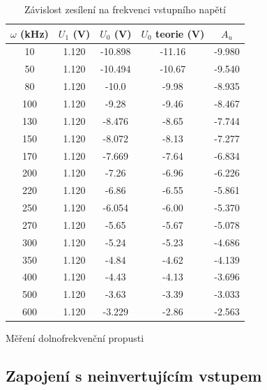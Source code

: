 \documentclass[a4paper,11pt]{article}
\begin{document}
\begin{table}[h]
    \begin{minipage}{.5\linewidth}
        \centering
        \begin{tabular}{| c c c c c |}
            \hline
            $ \omega $ (kHz) & $ U_1 $ (V)  & $ U_0 $  (V) & $ U_0 $ teorie (V) & $ A_u $  \\
            \hline    
            10  & 1.120 &  -10.898  &  -11.16 & -9.980 \\
            50  & 1.120 &  -10.494  &  -10.67 & -9.540 \\
            80  & 1.120 &  -10.0    &  -9.98  & -8.935 \\
            100 & 1.120 &  -9.28    &  -9.46  & -8.467 \\
            130 & 1.120 &  -8.476   &  -8.65  & -7.744 \\
            150 & 1.120 &  -8.072   &  -8.13  & -7.277 \\
            170 & 1.120 &  -7.669   &  -7.64  & -6.834 \\
            200 & 1.120 &  -7.26    &  -6.96  & -6.226 \\
            220 & 1.120 &  -6.86    &  -6.55  & -5.861 \\
            250 & 1.120 &  -6.054   &  -6.00  & -5.370 \\
            270 & 1.120 &  -5.65    &  -5.67  & -5.078 \\
            300 & 1.120 &  -5.24    &  -5.23  & -4.686 \\
            350 & 1.120 &  -4.84    &  -4.62  & -4.139 \\
            400 & 1.120 &  -4.43    &  -4.13  & -3.696 \\
            500 & 1.120 &  -3.63    &  -3.39  & -3.033 \\
            600 & 1.120 &  -3.229   &  -2.86  & -2.563 \\
            \hline
        \end{tabular}
        \caption{Měření dolnofrekvenční propusti}
    \end{minipage} 
    \hfill
    \begin{minipage}{.45\linewidth}
        \centering
        \resizebox{\textwidth}{!}{  }
        \captionsetup{type=graph}
        \caption{Závislost zesílení na frekvenci vstupního napětí}
    \end{minipage} 
\end{table}

\subsection{Zapojení s neinvertujícím vstupem}
\end{document}
